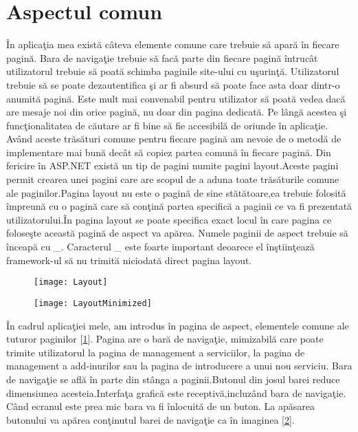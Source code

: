\documentclass[a4paper,12pt]{report}
\let\oldref\ref
\renewcommand{\ref}[1]{[\oldref{#1}]}
\begin{document}
\section{Aspectul comun}

\^In aplica\c tia mea exist\u a c\^ateva elemente comune care trebuie s\u a apar\u a \^in fiecare pagin\u a.
Bara de naviga\c tie trebuie s\u a fac\u a parte din fiecare pagin\u a \^intruc\^at utilizatorul trebuie 
s\u a poat\u a schimba paginile site-ului cu u\c surin\c t\u a. Utilizatorul trebuie s\u a se poate 
dezautentifica \c si ar fi absurd s\u a poate face asta doar dintr-o anumit\u a pagin\u a. Este mult mai 
convenabil pentru utilizator s\u a poat\u a vedea dac\u a are mesaje noi din orice pagin\u a, nu doar 
din pagina dedicat\u a. Pe l\^ang\u a acestea \c si func\c tionalitatea de c\u autare ar fi bine s\u a fie accesibil\u a
de oriunde \^in aplica\c tie. Av\^and aceste tr\u as\u aturi comune pentru fiecare pagin\u a am nevoie de 
o metod\u a de implementare mai bun\u a dec\^at s\u a copiez partea comun\u a \^in fiecare pagin\u a.
Din fericire \^in ASP.NET exist\u a un tip de pagini numite pagini layout.Aceste pagini permit crearea 
unei pagini care are scopul de a aduna toate tr\u as\u aturile comune ale paginilor.Pagina layout nu este o pagin\u a de sine
st\u at\u atoare,ea trebuie folosit\u a \^impreun\u a cu o pagin\u a care s\u a con\c tin\u a partea specific\u a 
a paginii ce va fi prezentat\u a utilizatorului.\^In pagina layout se poate specifica exact locul \^in care pagina
ce folose\c ste aceast\u a pagin\u a de aspect va ap\u area. Numele paginii de aspect trebuie s\u a \^inceap\u a cu \_.
Caracterul \_ este foarte important deoarece el \^in\c stiin\c teaz\u a framework-ul s\u a nu trimit\u a niciodat\u a
direct pagina layout. 

\begin{figure}[!htb]
	\texttt{[image: Layout]}
	\label{fig:Layout}
\end{figure}

\begin{figure}[!htb]
	\texttt{[image: LayoutMinimized]}
	\label{fig:LayoutMinimized}
\end{figure}

\^In cadrul aplica\c tiei mele, am introdus \^in pagina de aspect, elementele comune ale tuturor paginilor \ref{fig:Layout}.
Pagina are o bar\u a de naviga\c tie, mimizabil\u a care poate trimite utilizatorul la pagina de management a
serviciilor, la pagina de management a add-inurilor sau la pagina de introducere a unui nou serviciu.
Bara de naviga\c tie se afl\u a \^in parte din st\^anga a paginii.Butonul din josul barei reduce dimensiunea
acesteia.Interfa\c ta grafic\u a este receptiv\u a,incluz\^and bara de naviga\c tie. C\^and ecranul este prea mic
bara va fi \^inlocuit\u a de un buton. La ap\u asarea butonului va ap\u area con\c tinutul barei de naviga\c tie
ca \^in imaginea \ref{fig:LayoutMinimized}.
\end{document}
